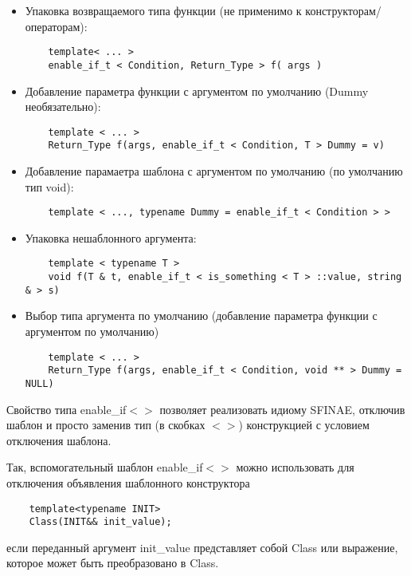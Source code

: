 \documentclass[a4paper,12pt]{article}	%
\begin{document}
	\begin{itemize}
	
		\item Упаковка возвращаемого типа функции (не применимо к конструкторам/операторам):
		
		\begin{lstlisting}
	template< ... >
	enable_if_t < Condition, Return_Type > f( args )
		\end{lstlisting}
		
		\item Добавление параметра функции с аргументом по умолчанию (Dummy необязательно):
		
		\begin{lstlisting}
	template < ... >
	Return_Type f(args, enable_if_t < Condition, T > Dummy = v)
		\end{lstlisting}
				
		\item Добавление парамаетра шаблона с аргументом по умолчанию (по умолчанию тип void):
		
		\begin{lstlisting}
	template < ..., typename Dummy = enable_if_t < Condition > >
		\end{lstlisting}
				
		\item Упаковка нешаблонного аргумента:
		
		\begin{lstlisting}
	template < typename T >
	void f(T & t, enable_if_t < is_something < T > ::value, string & > s)
		\end{lstlisting}
				
		\item Выбор типа аргумента по умолчанию (добавление параметра функции с аргументом по умолчанию)
		
		\begin{lstlisting}
	template < ... >
	Return_Type f(args, enable_if_t < Condition, void ** > Dummy = NULL)
		\end{lstlisting}
			
	\end{itemize}	

	Свойство типа enable\_if$<>$ позволяет реализовать идиому SFINAE, отключив шаблон и просто заменив тип (в скобках $<>$) конструкцией с условием отключения шаблона.
	
	Так, вспомогательный шаблон enable\_if$<>$ можно использовать для отключения объявления шаблонного конструктора
	
	\begin{lstlisting}
	template<typename INIT>
	Class(INIT&& init_value);
	\end{lstlisting}
если переданный аргумент init\_value представляет собой Class или выражение, которое может быть преобразовано в Class. 
	
\end{document}
